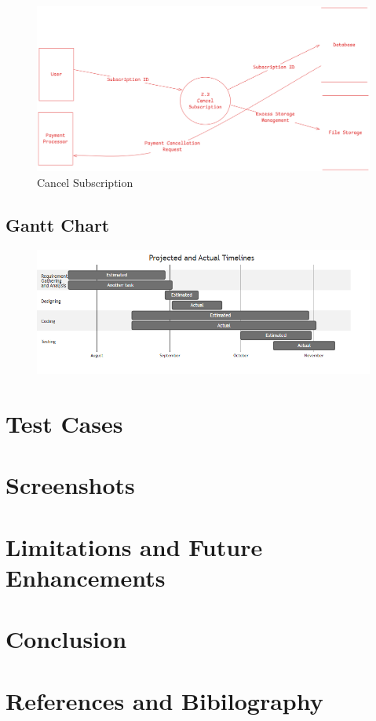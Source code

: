 \documentclass[12pt,a4paper]{report}
\begin{document}
\begin{figure}[H]
	\includegraphics[width=\textwidth]{dfd-L2-cancel_subscription.png}
	\caption{Cancel Subscription}
\end{figure}

\section{Gantt Chart}\label{sec:gantt_chart}
\begin{figure}[H]
	\includegraphics[width=\textwidth]{gantt.png}
\end{figure}

\newpage
\chapter{Test Cases}\label{cha:test_cases}
\newpage
\chapter{Screenshots}\label{cha:screenshots}
\newpage
\chapter{Limitations and Future Enhancements}\label{cha:limitations_and_future_enhancements}
\newpage
\chapter{Conclusion}\label{cha:conclusion}
\newpage
\chapter{References and Bibilography}\label{cha:references_and_bibilography}
\end{document}
